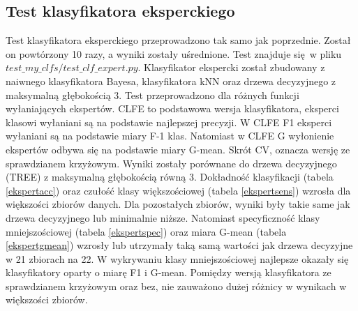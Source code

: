 \subsection{Test klasyfikatora eksperckiego}
Test klasyfikatora eksperckiego przeprowadzono tak samo jak poprzednie. Został on powtórzony 10 razy, a wyniki zostały uśrednione. Test znajduje się w pliku $test\_my\_clfs/test\_clf\_expert.py$. Klasyfikator ekspercki został zbudowany z naiwnego klasyfikatora Bayesa, klasyfikatora kNN oraz drzewa decyzyjnego z maksymalną głębokością 3. Test przeprowadzono dla różnych funkcji wyłaniających ekspertów. CLFE to podstawowa wersja klasyfikatora, eksperci klasowi wyłaniani są na podstawie najlepszej precyzji. W CLFE F1 eksperci wyłaniani są na podstawie miary F-1 klas. Natomiast w CLFE G wyłonienie ekspertów odbywa się na podstawie miary G-mean. Skrót CV, oznacza wersję ze sprawdzianem krzyżowym. Wyniki zostały porównane do drzewa decyzyjnego (TREE) z maksymalną głębokością równą 3. Dokładność klasyfikacji (tabela \ref{ekspertacc}) oraz czułość klasy większościowej (tabela \ref{ekspertsens}) wzrosła dla większości zbiorów danych. Dla pozostałych zbiorów, wyniki były takie same jak drzewa decyzyjnego lub minimalnie niższe. Natomiast specyficzność klasy mniejszościowej (tabela \ref{ekspertspec}) oraz miara G-mean (tabela \ref{ekspertgmean}) wzrosły lub utrzymały taką samą wartości jak drzewa decyzyjne w 21 zbiorach na 22. W wykrywaniu klasy mniejszościowej najlepsze okazały się klasyfikatory oparty o miarę F1 i G-mean. Pomiędzy wersją klasyfikatora ze sprawdzianem krzyżowym oraz bez, nie zauważono dużej różnicy w wynikach w większości zbiorów.
